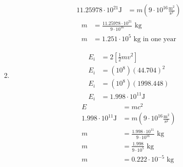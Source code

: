\documentclass[11pt,letterpaper, twocolumn]{article}
\begin{document}
\begin{enumerate}
\begin{align*}
        11.25978 \cdot 10^{21} \text{J} &= m (9\cdot 10^{16} \frac{\text{m$^2$}}{\text{s$^2$}})
    \end{align*}
    \begin{align*}
        m&= \frac{11.25978 \cdot 10^{21}}{9\cdot 10^{16}} \text{ kg}\\
        m&= 1.251 \cdot 10^{5} \text{ kg in one year}
    \end{align*}
    \item \begin{align*}
        E_i &= 2\left[\frac{1}{2}mv^2\right]\\
        E_i &= (10^8)(44.704)^2\\
        E_i &= (10^8)(1998.448)\\
        E_i &= 1.998 \cdot 10^{11} \text{J}
    \end{align*}
    \begin{align*}
        E&=mc^2\\
        1.998 \cdot 10^{11} \text{J}&= m (9\cdot 10^{16} \frac{\text{m$^2$}}{\text{s$^2$}})\\
        m &= \frac{1.998 \cdot 10^{11}}{9\cdot 10^{16}} \text{ kg}\\
        m &= \frac{1.998}{9\cdot 10^{5}} \text{ kg}\\
        m &= 0.222 \cdot 10^{-5} \text{ kg}
    \end{align*}
\end{enumerate}
\end{document}
